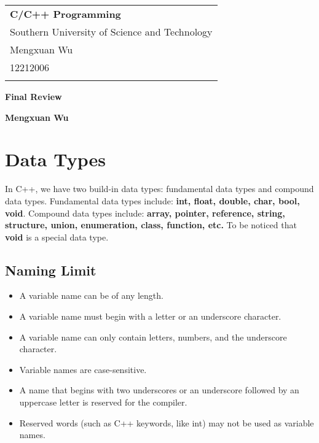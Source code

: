 \documentclass[a4paper,12pt]{article}
\begin{document}
\thispagestyle{empty} %

\begin{tabular}{p{15.5cm}}
{\large \bf C/C++ Programming} \\
Southern University of Science and Technology \\ Mengxuan Wu \\ 12212006 \\
\hline
\\
\end{tabular}

\vspace*{0.3cm} %

\begin{center}
	{\Large \bf Final Review}
	\vspace{2mm}

	{\bf Mengxuan Wu}
		
\end{center}  

\vspace{0.4cm}

\section{Data Types}

In C++, we have two build-in data types: fundamental data types and compound data types. 
Fundamental data types include: \textbf{int, float, double, char, bool, void}. 
Compound data types include: \textbf{array, pointer, reference, string, structure, union, enumeration, class, function, etc.}
To be noticed that \textbf{void} is a special data type.

\subsection{Naming Limit}

\begin{itemize}
	\item A variable name can be of any length.
	\item A variable name must begin with a letter or an underscore character.
	\item A variable name can only contain letters, numbers, and the underscore character.
	\item Variable names are case-sensitive.
	\item A name that begins with two underscores or an underscore followed by an uppercase letter is reserved for the compiler.
	\item Reserved words (such as C++ keywords, like int) may not be used as variable names.
\end{itemize}
\end{document}
